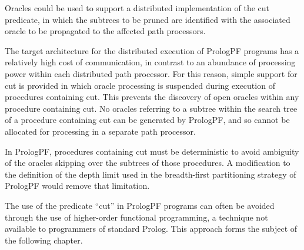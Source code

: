Oracles could be used to support a distributed implementation of the cut predicate, in
which the subtrees to be pruned are identified with the associated oracle to be propagated
to the affected path processors.

The target architecture for the distributed execution of PrologPF programs has a relatively
high cost of communication, in contrast to an abundance of processing power within each
distributed path processor.  For this reason, simple support for cut is provided in which
oracle processing is suspended during execution of procedures containing cut.  This prevents
the discovery of open oracles within any procedure containing cut. No oracles
referring to a subtree within the search tree of a procedure containing cut can be generated
by PrologPF, and so cannot be allocated for processing in a separate path processor.

In PrologPF, procedures containing cut must be deterministic to avoid ambiguity of the
oracles skipping over the subtrees of those procedures.  A modification to the definition
of the depth limit used in the breadth-first partitioning strategy of PrologPF would remove
that limitation.

The use of the predicate ``cut'' in PrologPF programs can often be
avoided through the use of higher-order functional programming, a
technique not available to programmers of standard Prolog.
This approach forms the subject of the following chapter.



